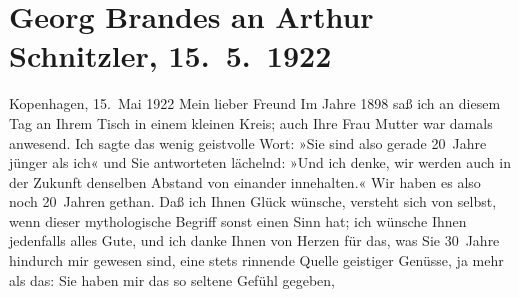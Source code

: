 

         
         \renewcommand{\erwaehntePersonen}{Personen:  ?? [Köchin von Georg Brandes], Georg Brandes, Louise Schnitzler,  Sokrates}
         \renewcommand{\erwaehnteOrte}{Orte: Athen, Frankreich, Griechenland, Griechisches Parlament, Izmir, Kopenhagen, Nationale und Kapodistrias-Universität Athen, Wien}
         \renewcommand{\erwaehnteWerke}{}
               \section[Georg Brandes an Arthur Schnitzler, 15. 5. 1922]{ Georg Brandes an Arthur Schnitzler, 15. 5. 1922}\nopagebreak{}\rehead{ }\begin{ledgroupsized}[t]{13cm}\normalsize\beginnumbering \toendnotes[C]{\smallbreak\pagebreak[2]} \toendnotes[C]{\smallbreak}\pstart
           \raggedleft{}{\pb}Kopenhagen, 15. Mai 1922\pend
           \pstart{}Mein lieber Freund\pend\pstart
           Im Jahre 1898 saß ich an diesem Tag an Ihrem Tisch in einem kleinen
               Kreis; auch Ihre Frau Mutter
               war damals anwesend. Ich sagte das wenig geistvolle Wort: »Sie sind also gerade
               20 Jahre jünger als ich« und Sie antworteten lächelnd: »Und ich denke, wir werden
               auch in der Zukunft denselben Abstand von einander innehalten.«\pend
           \pstart
           Wir haben es also noch 20 Jahren gethan. Daß ich Ihnen Glück wünsche, versteht sich
               von selbst, wenn dieser mythologische Begriff sonst einen Sinn hat; ich wünsche Ihnen
               jedenfalls alles Gute, und ich danke Ihnen von Herzen für das, was Sie 30 Jahre
               hindurch mir gewesen sind, eine stets rinnende Quelle geistiger Genüsse, ja mehr als
               das: Sie haben mir das so seltene Gefühl gegeben, \emph{\label{K_L02383-1v}}
\end{ledgroupsized}
